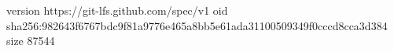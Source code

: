 version https://git-lfs.github.com/spec/v1
oid sha256:982643f6767bdc9f81a9776e465a8bb5e61ada31100509349f0cccd8cca3d384
size 87544
